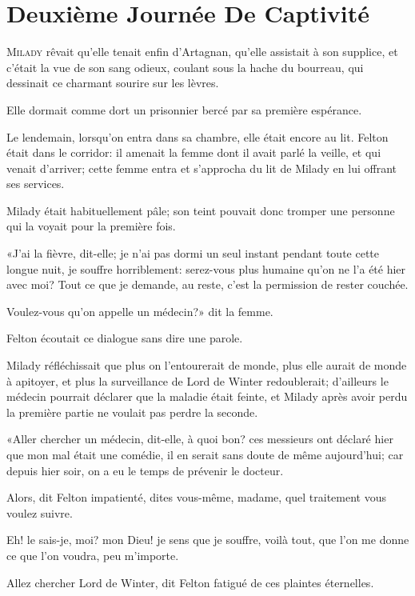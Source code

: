
\chapter{Deuxième Journée De Captivité}

\lettrine{M}{ilady} rêvait qu'elle tenait enfin d'Artagnan, qu'elle assistait à son supplice, et c'était la vue de son sang odieux, coulant sous la hache du bourreau, qui dessinait ce charmant sourire sur les lèvres. 

Elle dormait comme dort un prisonnier bercé par sa première espérance. 

Le lendemain, lorsqu'on entra dans sa chambre, elle était encore au lit. Felton était dans le corridor: il amenait la femme dont il avait parlé la veille, et qui venait d'arriver; cette femme entra et s'approcha du lit de Milady en lui offrant ses services. 

Milady était habituellement pâle; son teint pouvait donc tromper une personne qui la voyait pour la première fois. 

«J'ai la fièvre, dit-elle; je n'ai pas dormi un seul instant pendant toute cette longue nuit, je souffre horriblement: serez-vous plus humaine qu'on ne l'a été hier avec moi? Tout ce que je demande, au reste, c'est la permission de rester couchée. 

\speak  Voulez-vous qu'on appelle un médecin?» dit la femme. 

Felton écoutait ce dialogue sans dire une parole. 

Milady réfléchissait que plus on l'entourerait de monde, plus elle aurait de monde à apitoyer, et plus la surveillance de Lord de Winter redoublerait; d'ailleurs le médecin pourrait déclarer que la maladie était feinte, et Milady après avoir perdu la première partie ne voulait pas perdre la seconde. 

«Aller chercher un médecin, dit-elle, à quoi bon? ces messieurs ont déclaré hier que mon mal était une comédie, il en serait sans doute de même aujourd'hui; car depuis hier soir, on a eu le temps de prévenir le docteur. 

\speak  Alors, dit Felton impatienté, dites vous-même, madame, quel traitement vous voulez suivre. 

\speak  Eh! le sais-je, moi? mon Dieu! je sens que je souffre, voilà tout, que l'on me donne ce que l'on voudra, peu m'importe. 

\speak  Allez chercher Lord de Winter, dit Felton fatigué de ces plaintes éternelles. 

